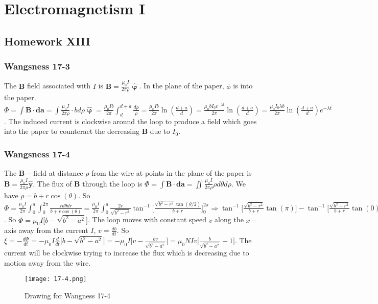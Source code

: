 \documentclass[crop=false,class=article,oneside]{standalone}
\begin{document}
    \ifx\ifemagi\undefined
        \section*{Electromagnetism I}
        \setcounter{section}{13}
        \renewcommand\thesubfigure{%
            \arabic{section}.\arabic{figure}.\arabic{subfigure}%
        }
    \fi 
    \subsection{Homework XIII}
        \subsubsection{Wangsness 17-3}
        The $\mathbf{B}$ field associated with $I$ is $\mathbf{B} = \frac{\mu_0 I}{2\pi \rho} \hat{\boldsymbol{\upvarphi}}$. In the plane of the paper, $\phi$ is into the paper. $\Phi = \int \mathbf{B}\cdot \mathbf{da} = \int \frac{\mu_0 I}{2\pi \rho} \cdot b d\rho \hat{\boldsymbol{\upvarphi}} = \frac{\mu_0Ib}{2\pi} \int_{d}^{d+a} \frac{d\rho}{\rho}= \frac{\mu_0 Ib}{2\pi} \ln(\frac{d+a}{d}) = \frac{\mu_0 bI_0 e^{-\lambda t}}{2\pi} \ln(\frac{d+a}{d}) = \frac{\mu_0 I_0 \lambda b}{2\pi} \ln(\frac{d+a}{d})e^{-\lambda t}$. The induced current is clockwise around the loop to produce a field which goes into the paper to counteract the decreasing $\mathbf{B}$ due to $I_0$.
        \subsubsection{Wangsness 17-4}
        The $\mathbf{B}-$field at distance $\rho$ from the wire at points in the plane of the paper is $\mathbf{B} = \frac{\mu_0 I}{2\pi \rho} \hat{\mathbf{y}}$. The flux of $\mathbf{B}$ through the loop is $\Phi = \int \mathbf{B}\cdot \mathbf{da} = \iint \frac{\mu_0 I}{2\pi \rho}\rho d\theta d\rho$. We have $\rho = b+r\cos(\theta)$. So $\Phi = \frac{\mu_0 I}{2\pi} \int_{0}^{a} \int_{0}^{2\pi} \frac{r d\theta dr}{b+r\cos(\theta)} = \frac{\mu_0 I}{2\pi} \int_{0}^{a} \frac{2r}{\sqrt{b^2-r^2}}\tan^{-1}\big[\frac{\sqrt{b^2-r^2}\tan(\theta/2)}{b+r}\big]_{0}^{2\pi} \Rightarrow \tan^{-1}\big[\frac{\sqrt{b^2-r^2}}{b+r}\tan(\pi)\big] - \tan^{-1}\big[ \frac{\sqrt{b^2-r^2}}{b+r}\tan(0)\big]$. So $\Phi = \mu_0 I\big[b-\sqrt{b^2-a^2}\big]$. The loop moves with constant speed $v$ along the $x-$axis away from the current $I$, $v = \frac{db}{dt}$. So $\xi = -\frac{d\Phi}{dt} = -\mu_0 I \frac{d}{dt}\big[b-\sqrt{b^2-a^2}\big] = -\mu_0 I\big[ v-\frac{bv}{\sqrt{b^2-a^2}}\big] = \mu_0 NIv\big[ \frac{b}{\sqrt{b^2-a^2}}-1\big]$. The current will be clockwise trying to increase the flux which is decreasing due to motion away from the wire.
        \begin{figure}[htbp]
            \centering
            {\texttt{[image: 17-4.png]}}
            \caption[Drawing for Wangsness 17-4]{Drawing for Wangness 17-4}
        \end{figure}
\end{document}
